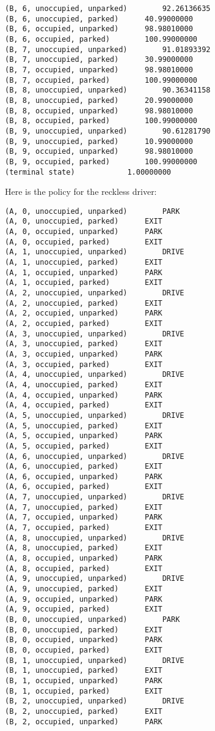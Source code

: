 \documentclass[paper=a4, fontsize=11pt]{scrartcl}
\begin{document}
\begin{verbatim}
(B, 6, unoccupied, unparked)		92.26136635
(B, 6, unoccupied, parked)		40.99000000
(B, 6, occupied, unparked)		98.98010000
(B, 6, occupied, parked)		100.99000000
(B, 7, unoccupied, unparked)		91.01893392
(B, 7, unoccupied, parked)		30.99000000
(B, 7, occupied, unparked)		98.98010000
(B, 7, occupied, parked)		100.99000000
(B, 8, unoccupied, unparked)		90.36341158
(B, 8, unoccupied, parked)		20.99000000
(B, 8, occupied, unparked)		98.98010000
(B, 8, occupied, parked)		100.99000000
(B, 9, unoccupied, unparked)		90.61281790
(B, 9, unoccupied, parked)		10.99000000
(B, 9, occupied, unparked)		98.98010000
(B, 9, occupied, parked)		100.99000000
(terminal state)			1.00000000
\end{verbatim}

Here is the policy for the reckless driver:

\begin{verbatim}
(A, 0, unoccupied, unparked)		PARK
(A, 0, unoccupied, parked)		EXIT
(A, 0, occupied, unparked)		PARK
(A, 0, occupied, parked)		EXIT
(A, 1, unoccupied, unparked)		DRIVE
(A, 1, unoccupied, parked)		EXIT
(A, 1, occupied, unparked)		PARK
(A, 1, occupied, parked)		EXIT
(A, 2, unoccupied, unparked)		DRIVE
(A, 2, unoccupied, parked)		EXIT
(A, 2, occupied, unparked)		PARK
(A, 2, occupied, parked)		EXIT
(A, 3, unoccupied, unparked)		DRIVE
(A, 3, unoccupied, parked)		EXIT
(A, 3, occupied, unparked)		PARK
(A, 3, occupied, parked)		EXIT
(A, 4, unoccupied, unparked)		DRIVE
(A, 4, unoccupied, parked)		EXIT
(A, 4, occupied, unparked)		PARK
(A, 4, occupied, parked)		EXIT
(A, 5, unoccupied, unparked)		DRIVE
(A, 5, unoccupied, parked)		EXIT
(A, 5, occupied, unparked)		PARK
(A, 5, occupied, parked)		EXIT
(A, 6, unoccupied, unparked)		DRIVE
(A, 6, unoccupied, parked)		EXIT
(A, 6, occupied, unparked)		PARK
(A, 6, occupied, parked)		EXIT
(A, 7, unoccupied, unparked)		DRIVE
(A, 7, unoccupied, parked)		EXIT
(A, 7, occupied, unparked)		PARK
(A, 7, occupied, parked)		EXIT
(A, 8, unoccupied, unparked)		DRIVE
(A, 8, unoccupied, parked)		EXIT
(A, 8, occupied, unparked)		PARK
(A, 8, occupied, parked)		EXIT
(A, 9, unoccupied, unparked)		DRIVE
(A, 9, unoccupied, parked)		EXIT
(A, 9, occupied, unparked)		PARK
(A, 9, occupied, parked)		EXIT
(B, 0, unoccupied, unparked)		PARK
(B, 0, unoccupied, parked)		EXIT
(B, 0, occupied, unparked)		PARK
(B, 0, occupied, parked)		EXIT
(B, 1, unoccupied, unparked)		DRIVE
(B, 1, unoccupied, parked)		EXIT
(B, 1, occupied, unparked)		PARK
(B, 1, occupied, parked)		EXIT
(B, 2, unoccupied, unparked)		DRIVE
(B, 2, unoccupied, parked)		EXIT
(B, 2, occupied, unparked)		PARK

\end{verbatim}
\end{document}
